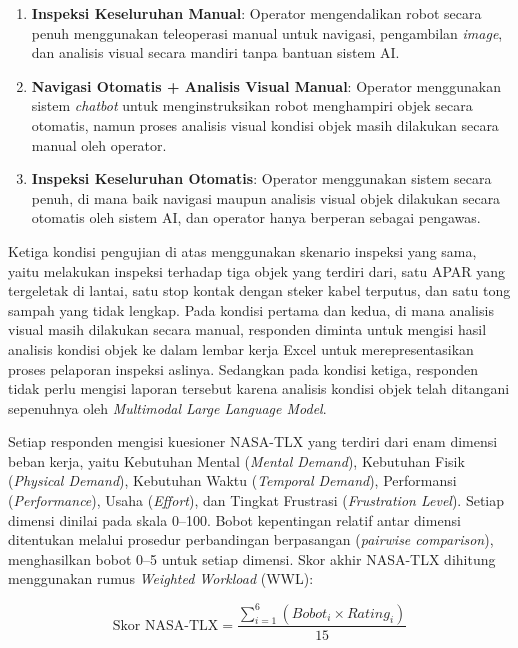 \begin{enumerate}
    \item \textbf{Inspeksi Keseluruhan Manual}: Operator mengendalikan robot secara penuh menggunakan teleoperasi manual untuk navigasi, pengambilan \textit{image}, dan analisis visual secara mandiri tanpa bantuan sistem AI.
    \item \textbf{Navigasi Otomatis + Analisis Visual Manual}: Operator menggunakan sistem \textit{chatbot} untuk menginstruksikan robot menghampiri objek secara otomatis, namun proses analisis visual kondisi objek masih dilakukan secara manual oleh operator.
    \item \textbf{Inspeksi Keseluruhan Otomatis}: Operator menggunakan sistem secara penuh, di mana baik navigasi maupun analisis visual objek dilakukan secara otomatis oleh sistem AI, dan operator hanya berperan sebagai pengawas.
\end{enumerate}

Ketiga kondisi pengujian di atas menggunakan skenario inspeksi yang sama, yaitu melakukan inspeksi terhadap tiga objek yang terdiri dari, satu APAR yang tergeletak di lantai, satu stop kontak dengan steker kabel terputus, dan satu tong sampah yang tidak lengkap. Pada kondisi pertama dan kedua, di mana analisis visual masih dilakukan secara manual, responden diminta untuk mengisi hasil analisis kondisi objek ke dalam lembar kerja Excel untuk merepresentasikan proses pelaporan inspeksi aslinya. Sedangkan pada kondisi ketiga, responden tidak perlu mengisi laporan tersebut karena analisis kondisi objek telah ditangani sepenuhnya oleh \textit{Multimodal Large Language Model}.

Setiap responden mengisi kuesioner NASA-TLX yang terdiri dari enam dimensi beban kerja, yaitu Kebutuhan Mental (\textit{Mental Demand}), Kebutuhan Fisik (\textit{Physical Demand}), Kebutuhan Waktu (\textit{Temporal Demand}), Performansi (\textit{Performance}), Usaha (\textit{Effort}), dan Tingkat Frustrasi (\textit{Frustration Level}). Setiap dimensi dinilai pada skala 0--100. Bobot kepentingan relatif antar dimensi ditentukan melalui prosedur perbandingan berpasangan (\textit{pairwise comparison}), menghasilkan bobot 0--5 untuk setiap dimensi. Skor akhir NASA-TLX dihitung menggunakan rumus \textit{Weighted Workload} (WWL):

\begin{equation}
\text{Skor NASA-TLX} = \frac{\sum_{i=1}^{6} (Bobot_i \times Rating_i)}{15}
\label{eq:nasa_tlx}
\end{equation}

